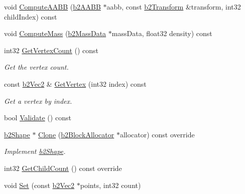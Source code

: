 \begin{DoxyCompactItemize}
void \hyperlink{classb2PolygonShape_a01f0739b15f657a355f1f4525e75dbfe}{Compute\+A\+A\+BB} (\hyperlink{structb2AABB}{b2\+A\+A\+BB} $\ast$aabb, const \hyperlink{structb2Transform}{b2\+Transform} \&transform, int32 child\+Index) const
\item 
void \hyperlink{classb2PolygonShape_a33e75858a1b9e26fdf7f723825cda878}{Compute\+Mass} (\hyperlink{structb2MassData}{b2\+Mass\+Data} $\ast$mass\+Data, float32 density) const
\item 
\mbox{\label{classb2PolygonShape_a1531f99f9dcab03929ea08beb3a79631}} 
int32 \hyperlink{classb2PolygonShape_a1531f99f9dcab03929ea08beb3a79631}{Get\+Vertex\+Count} () const
\begin{DoxyCompactList}\small\item\em Get the vertex count. \end{DoxyCompactList}\item 
\mbox{\label{classb2PolygonShape_a12710c5caa9134f0af11f37dbedbd409}} 
const \hyperlink{structb2Vec2}{b2\+Vec2} \& \hyperlink{classb2PolygonShape_a12710c5caa9134f0af11f37dbedbd409}{Get\+Vertex} (int32 index) const
\begin{DoxyCompactList}\small\item\em Get a vertex by index. \end{DoxyCompactList}\item 
bool \hyperlink{classb2PolygonShape_a135f4c20e17f10479e08f7befbd4d1f0}{Validate} () const
\item 
\mbox{\label{classb2PolygonShape_ab3409517e0e6ae926998f78238a38954}} 
\hyperlink{classb2Shape}{b2\+Shape} $\ast$ \hyperlink{classb2PolygonShape_ab3409517e0e6ae926998f78238a38954}{Clone} (\hyperlink{classb2BlockAllocator}{b2\+Block\+Allocator} $\ast$allocator) const override
\begin{DoxyCompactList}\small\item\em Implement \hyperlink{classb2Shape}{b2\+Shape}. \end{DoxyCompactList}\item 
int32 \hyperlink{classb2PolygonShape_aa8bb0d5a88624104425cdee0b2f4427a}{Get\+Child\+Count} () const override
\item 
void \hyperlink{classb2PolygonShape_a4d7b35550509f570814b97325a68966b}{Set} (const \hyperlink{structb2Vec2}{b2\+Vec2} $\ast$points, int32 count)
\item 

\end{DoxyCompactItemize}
